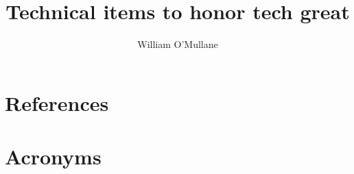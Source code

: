 \documentclass[DM,authoryear,toc]{lsstdoc}
\title{Technical items to honor tech great}
\author{%
William O'Mullane
}
\date{\vcsDate}
\begin{document}
\maketitle



\appendix
\section{References} \label{sec:bib}


\section{Acronyms} \label{sec:acronyms}

\end{document}
